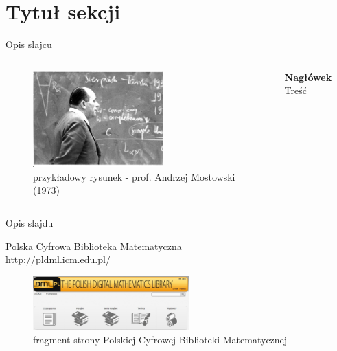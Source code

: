 \documentclass[11pt]{beamer}
\begin{document}
\section{Tytuł sekcji}
\begin{frame}{Opis slajcu}
\begin{minipage}[0.5\textheight]{\textwidth}
\begin{columns}[T]

\begin{column}{0.5\textwidth}
\begin{figure}
\centering
\captionsetup{justification=centering}
\captionsetup{labelformat=empty}
\includegraphics[width=5cm]{AndrzejMostowski73}
\caption{{\tiny przykładowy rysunek - prof. Andrzej Mostowski (1973)}}
\end{figure}
\end{column}


\begin{column}{0.5\textwidth}

\textbf{Nagłówek} Treść

\end{column}


\end{columns}
\end{minipage}


\end{frame}
\begin{frame}{Opis slajdu}
\begin{center}
Polska Cyfrowa Biblioteka Matematyczna \\

\url{http://pldml.icm.edu.pl/}

\begin{figure}[!b]
\centering
\captionsetup{justification=centering}
\captionsetup{labelformat=empty}
\includegraphics[width=6cm]{DML}
\caption{{\tiny fragment strony Polskiej Cyfrowej Biblioteki Matematycznej}}
\end{figure}

\end{center}

\end{frame}
\end{document}
